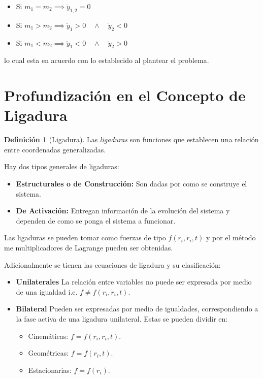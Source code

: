 \documentclass{article}
\theoremstyle{definition}
\newtheorem*{definition}{Definición}
\begin{document}
\begin{itemize}
	\item Si $m_1 = m_2 \implies \ddot{y}_{1,2} = 0$
	\item Si $m_1 > m_2 \implies \ddot{y}_1 > 0 \quad \land \quad \ddot{y}_2 < 0$
	\item Si $m_1 < m_2 \implies \ddot{y}_1 < 0 \quad \land \quad  \ddot{y}_2 > 0$
\end{itemize}

lo cual esta en acuerdo con lo establecido al plantear el problema.

\section{Profundización en el Concepto de Ligadura}
\begin{definition}[Ligadura]
	Las \emph{ligaduras} son funciones que establecen una relación entre coordenadas generalizadas.
\end{definition}

Hay dos tipos generales de ligaduras:

\begin{itemize}
	\item \textbf{Estructurales o de Construcción:} Son dadas por como se construye el sistema.
	\item \textbf{De Activación:} Entregan información de la evolución del sistema y dependen de como se ponga el sistema a funcionar.
\end{itemize}

Las ligaduras se pueden tomar como fuerzas de tipo $f(r_i, \dot{r}_i, t)$ y por el método me multiplicadores de Lagrange pueden ser obtenidas.

Adicionalmente se tienen las ecuaciones de ligadura y su clasificación:

\begin{itemize}
	\item \textbf{Unilaterales} La relación entre variables no puede ser expresada por medio de una igualdad i.e. $f \ne f(r_i, \dot{r}_i, t)$.
	\item \textbf{Bilateral} Pueden ser expresadas por medio de igualdades, correspondiendo a la fase activa de una ligadura unilateral. Estas se pueden dividir en:
		\begin{itemize}
			\item Cinemáticas: $f = f(r_i, \dot{r}_i, t)$.
			\item Geométricas: $f = f(r_i, t)$.
			\item Estacionarias: $f = f(r_i)$.
		\end{itemize}
\end{itemize}
\end{document}
